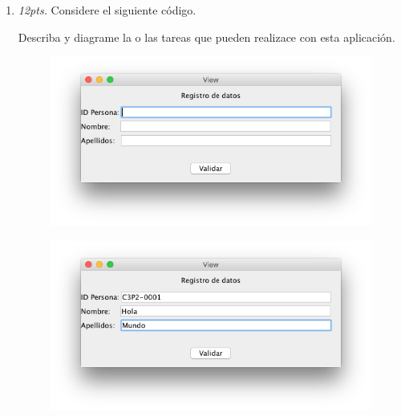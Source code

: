 \documentclass[10pt]{article}
\begin{document}
{\begin{enumerate}
\begin{multicols}{2}
\end{multicols}
\newpage

\item \emph{12pts.} Considere el siguiente c\'odigo.

 

Describa y diagrame la o las tareas que pueden realizace con esta aplicaci\'on.

\newpage

\begin{multicols}{2}
    
\begin{figure}[H]
    \begin{center}
        \includegraphics[scale=.45]{images/01.png}
    \end{center}
\end{figure}

\begin{figure}[H]
    \begin{center}
        \includegraphics[scale=.45]{images/05.png}
    \end{center}
\end{figure}


\end{multicols}
\end{enumerate}}
\end{document}
